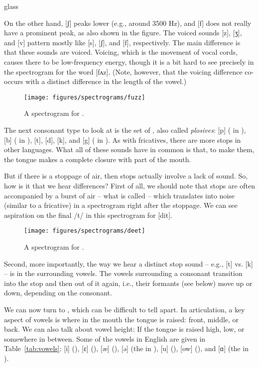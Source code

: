 \begin{tblsfilledsymbol}{}{glass}
\begin{underthehood}
On the other hand,
[ʃ] peaks lower (e.g., around 3500 Hz), and {[f]}
does not really have a prominent peak, as also shown in the figure.
The voiced sounds {[z]}, [ʒ], and {[v]}
pattern mostly like {[s]}, [ʃ], and {[f]},
respectively.  The main difference is that these sounds are voiced.
Voicing, which is the movement of vocal cords, causes there to be
low-frequency energy, though it is a bit hard to see precisely in the
spectrogram for the word  [fʌz].
(Note, however, that the voicing difference co-occurs with a distinct
difference in the length of the vowel.)



\begin{figure}[H]
\texttt{[image: figures/spectrograms/fuzz]}
\caption{A spectrogram for .}
\label{fig:fuzz}
\end{figure}

The next consonant type to look at is the set of , also called \emph{plosives}: {[p]} ( in ), {[b]} ( in ),
{[t]}, {[d]}, {[k]}, and {[g]} ( in ).  As
with fricatives, there are more stops in other languages.
What all of these sounds have in common is that, to make them, the
tongue makes a complete closure with part of the mouth.

But if there is a stoppage of air, then stops actually involve a lack
of sound.  So, how is it that we hear differences?  First of all, we
should note that stops are often accompanied by a burst of air -- what
is called  -- which translates into noise (similar to
a fricative) in a spectrogram right after the stoppage.    We can see aspiration on the final /t/ in this spectrogram for  [dit].

\begin{figure}[H]
\texttt{[image: figures/spectrograms/deet]}
\caption{A spectrogram for .}
\label{fig:deet}
\end{figure}

Second, more importantly, the way we hear a distinct stop
sound -- e.g., {[t]} vs. {[k]} -- is in the surrounding
vowels.  The vowels surrounding a consonant transition into the stop
and then out of it again, i.e., their formants (see below) move up or
down, depending on the consonant. 


We can now turn to , which can be difficult
to tell apart.  In articulation, a key aspect of vowels is
where in the mouth the tongue is raised: front, middle, or back.  We
can also talk about vowel height: If the tongue is raised high, low,
or somewhere in between.  Some of the vowels in English are given in
Table~\ref{tab:vowels}: {[i]} (), [ɛ]
(), [æ] (), [ə] (the
 in ), {[u]} (),
{[ow]} (), and [ɑ] (the  in
). 


\end{underthehood}
\end{tblsfilledsymbol}
